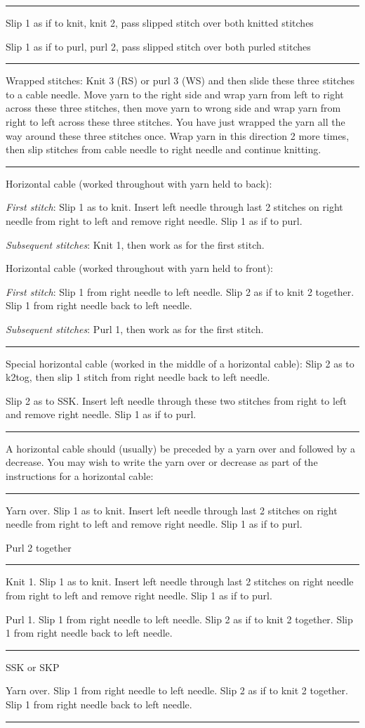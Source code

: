 \documentclass{article}
\newif \ifdesigner
\newlength{\symbolcolwidth}
\newlength{\singlecolwidth}
\newlength{\doublecolwidth}
\newcommand{\setcolwidths}[1]{
	\setlength{\symbolcolwidth}{#1}
	\addtolength{\symbolcolwidth}{1pt}
	\setlength{\doublecolwidth}{\textwidth}
	\addtolength{\doublecolwidth}{-4\tabcolsep}
	\addtolength{\doublecolwidth}{-1.2pt} %
	\addtolength{\doublecolwidth}{-\symbolcolwidth}
	\setlength{\singlecolwidth}{0.5\doublecolwidth}
	\addtolength{\singlecolwidth}{-1\tabcolsep}
	\addtolength{\singlecolwidth}{-0.2pt} %
	}
\newcommand\keyrow[3]{\par\allowbreak\hrule\par\nopagebreak\noindent
	\vrule\hfill 
	\begin{minipage}{\symbolcolwidth}\centering#1\end{minipage}%
	\hfill\vrule\hfill
	\begin{minipage}{\singlecolwidth}
		\raisebox{1pt}{\strut}#2\raisebox{-1pt}{\strut}\end{minipage}%
	\hfill\vrule\hfill
	\begin{minipage}{\singlecolwidth}
		\raisebox{1pt}{\strut}#3\raisebox{-1pt}{\strut}\end{minipage}%
	\hfill\vrule
	\par\nointerlineskip}
\newcommand\dblkeyrow[2]{\par\allowbreak\hrule\par\nopagebreak\noindent
	\vrule\hfill
	\begin{minipage}{\symbolcolwidth}\centering#1\end{minipage}%
	\hfill\vrule\hfill
	\begin{minipage}{\doublecolwidth}
		\raisebox{1pt}{\strut}#2\raisebox{-1pt}{\strut}\end{minipage}%
	\hfill\vrule
	\par\nointerlineskip}
\begin{document}
\begin{fullpages}
\setcolwidths{3\stitchwd}
\keyrow{}{Slip 1 as if to knit, knit 2, pass slipped stitch over both knitted stitches}{Slip 1 as if to purl, purl 2, pass slipped stitch over both purled stitches}
\dblkeyrow{}{Wrapped stitches: Knit 3 (RS) or purl 3 (WS) and then slide these three stitches to a cable needle. Move yarn to the right side and wrap yarn from left to right across these three stitches, then move yarn to wrong side and wrap yarn from right to left across these three stitches. You have just wrapped the yarn all the way around these three stitches once. Wrap yarn in this direction 2 more times, then slip stitches from cable needle to right needle and continue knitting.}
\keyrow{\textknit{+++}}
{Horizontal cable (worked throughout with yarn held to back):
\par\emph{First stitch}: Slip 1 as to knit. Insert left needle through  last 2 stitches on right needle from right to left and remove right needle. Slip 1 as if to purl.
\par\emph{Subsequent stitches}: Knit 1, then work as for the first stitch.}
{Horizontal cable (worked throughout with yarn held to front):
\par\emph{First stitch}: Slip 1 from right needle to left needle. Slip 2 as if to knit 2 together. Slip 1 from right needle back to left needle.
\par\emph{Subsequent stitches}: Purl 1, then work as for the first stitch.}
\keyrow{\textknit{/}}
{Special horizontal cable (worked in the middle of a horizontal cable): Slip 2 as to k2tog, then slip 1 stitch from right needle back to left needle.}
{Slip 2 as to SSK. Insert left needle through these two stitches from right to left and remove right needle. Slip 1 as if to purl.}
\hrule

\medskip

\ifdesigner

A horizontal cable should (usually) be preceded by a yarn over and followed by a decrease. You may wish to write the yarn over or decrease as part of the instructions for a horizontal cable:

\medskip

\setcolwidths{\stitchwd}
{\knitgrid

\keyrow{}
{Yarn over. Slip 1 as to knit. Insert left needle through  last 2 stitches on right needle from right to left and remove right needle. Slip 1 as if to purl.}{Purl 2 together}
\keyrow{}
{Knit 1. Slip 1 as to knit. Insert left needle through  last 2 stitches on right needle from right to left and remove right needle. Slip 1 as if to purl.}
{Purl 1. Slip 1 from right needle to left needle. Slip 2 as if to knit 2 together. Slip 1 from right needle back to left needle.}
\keyrow{\textknit{+}}{SSK or SKP}{Yarn over. Slip 1 from right needle to left needle. Slip 2 as if to knit 2 together. Slip 1 from right needle back to left needle.}
}
\hrule


\end{fullpages}
\end{document}
